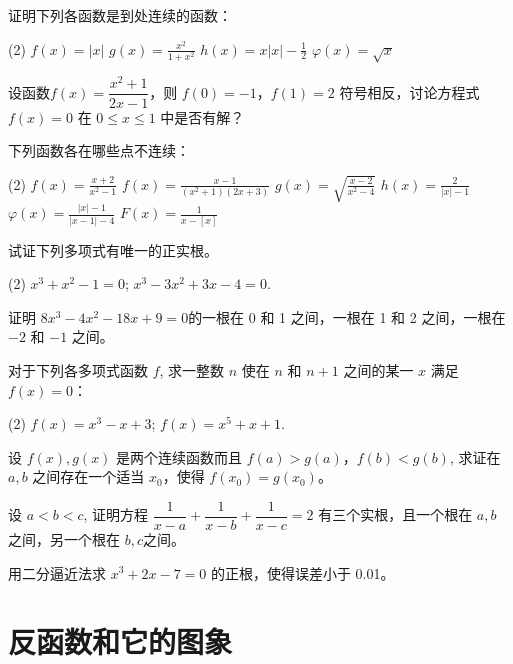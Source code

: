 \begin{Exercise}
\begin{question}[itemsep=5pt]
  \item 证明下列各函数是到处连续的函数：
  \begin{tasks}(2)
      \task $f(x)=|x|$
      \task $g(x)=\frac{x^2}{1+x^2}$
      \task $h(x)=x|x|-\frac{1}{2}$
      \task $\varphi(x)=\sqrt{x}$
  \end{tasks}
  \item 设函数$f(x)=\dfrac{x^2+1}{2x-1}$，则 $f(0)=-1$，$f(1)=2$ 符号相反，讨论方程式 $f(x)=0$ 在 $0\leqslant x\leqslant 1$ 中是否有解？
  \item 下列函数各在哪些点不连续：
  \begin{tasks}(2)
    \task $\displaystyle f(x)=\frac{x+2}{x^2-1}$
    \task $\displaystyle f(x)=\frac{x-1}{(x^2+1)(2x+3)}$
    \task $\displaystyle g(x)=\sqrt{\frac{x-2}{x^2-4}}$
    \task $\displaystyle h(x)=\frac{2}{|x|-1}$
    \task $\displaystyle \varphi(x)=\frac{|x|-1}{|x-1|-4}$
    \task $\displaystyle F(x)=\frac{1}{x-[x]}$
  \end{tasks}
  \item 试证下列多项式有唯一的正实根。
  \begin{tasks}(2)
    \task $x^3+x^2-1=0$;
    \task $x^3-3x^2+3x-4=0$.
  \end{tasks}
  \item 证明 $8x^3-4x^2-18x+9=0$的一根在 0 和 1 之间，一根在 1 和 2 之间，一根在$-2$ 和 $-1$ 之间。
  \item 对于下列各多项式函数 $f$, 求一整数 $n$ 使在 $n$ 和 $n+1$ 之间的某一 $x$ 满足 $f(x)=0$：
  \begin{tasks}(2)
    \task $f(x)=x^3-x+3$;
    \task $f(x)=x^5+x+1$.
  \end{tasks}
  \item 设 $f(x),g(x)$ 是两个连续函数而且 $f(a)>g(a)$，$f(b)<g(b)$, 求证在 $a,b$ 之间存在一个适当 $x_0$，使得 $f(x_0)=g(x_0)$。
  \item 设 $a<b<c$, 证明方程 $\dfrac{1}{x-a}+\dfrac{1}{x-b}+\dfrac{1}{x-c}=2$ 有三个实根，且一个根在 $a,b$ 之间，另一个根在 $b,c$之间。
  \item 用二分逼近法求 $x^3+2x-7=0$ 的正根，使得误差小于 0.01。
\end{question}
\end{Exercise}


\section{反函数和它的图象}

